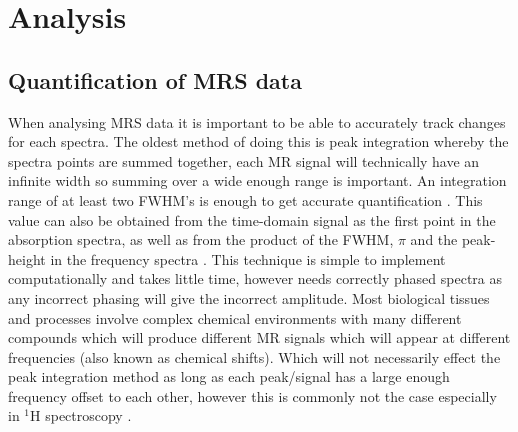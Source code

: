 \section{Analysis}

\subsection{Quantification of MRS data}

When analysing \ac{MRS} data it is important to be able to accurately track changes for each spectra. The oldest method of doing this is peak integration whereby the spectra points are summed together, each MR signal will technically have an infinite width so summing over a wide enough range is important. An integration range of at least two \ac{FWHM}'s is enough to get accurate quantification \cite{Near2021PreprocessingRecommendations}. This value can also be obtained from the time-domain signal as the first point in the absorption spectra, as well as from the product of the \ac{FWHM}, $\pi$ and the peak-height in the frequency spectra \cite{deGraaf2019InSpectroscopy}. This technique is simple to implement computationally and takes little time, however needs correctly phased spectra as any incorrect phasing will give the incorrect amplitude. Most biological tissues and processes involve complex chemical environments with many different compounds which will produce different MR signals which will appear at different frequencies (also known as chemical shifts). Which will not necessarily effect the peak integration method as long as each peak/signal has a large enough frequency offset to each other, however this is commonly not the case especially in $^1$H spectroscopy \cite{Alger2010QuantitativeReview}. 

